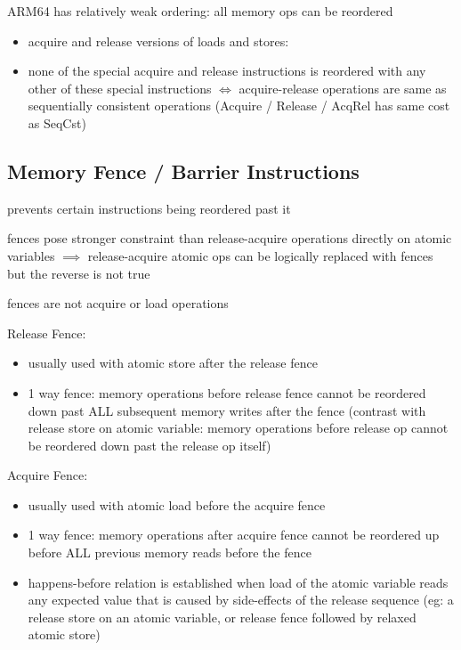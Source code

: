 \documentclass[8pt]{extarticle}
\begin{document}
\begin{multicols*}{2}
    ARM64 has relatively weak ordering: all memory ops can be reordered
    \begin{itemize}
    \item acquire and release versions of loads and stores:
      \begin{itemize}
      \item \verb%stlr% (store-release register)
      \item \verb%ldar% (load-acquire register)
      \item \verb%stlxr%(store-release exclusive register)
      \item \verb%ldaxr% (load-acquire exclusive register) 
      \end{itemize}
    \item none of the special acquire and release instructions is reordered with any other of these special instructions
    $\iff$ acquire-release operations are same as sequentially consistent operations (Acquire / Release / AcqRel has same cost as SeqCst)
    \end{itemize}

  \subsection{Memory Fence / Barrier Instructions}

    prevents certain instructions being reordered past it

    fences pose stronger constraint than release-acquire operations directly on atomic variables $\implies$ release-acquire atomic ops can be logically replaced with fences but the reverse is not true

    fences are not acquire or load operations

    Release Fence:
    \begin{itemize}
    \item usually used with atomic store after the release fence
    \item 1 way fence: memory operations before release fence cannot be reordered down past ALL subsequent memory writes after the fence (contrast with release store on atomic variable: memory operations before release op cannot be reordered down past the release op itself)
    \end{itemize}

    Acquire Fence: 
    \begin{itemize}
    \item usually used with atomic load before the acquire fence
    \item 1 way fence: memory operations after acquire fence cannot be reordered up before ALL previous memory reads before the fence
    \item happens-before relation is established when load of the atomic variable reads any expected value that is caused by side-effects of the release sequence (eg: a release store on an atomic variable, or release fence followed by relaxed atomic store)
    \end{itemize}


\end{multicols*}
\end{document}
